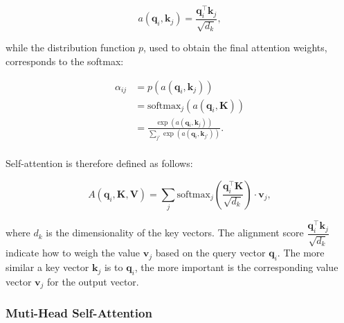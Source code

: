 \begin{equation}
\label{equation:related-pretrained-language-models-sa-alignment}
    a(\bm{q}_i, \bm{k}_j) = \frac{\bm{q}_i^{\top} \bm{k}_j}{\sqrt{d_k}}, 
\end{equation}

\noindent while the distribution function $p$, used to obtain the final attention weights, corresponds to the softmax: 

\begin{equation}
    \begin{aligned}
        \alpha_{ij} &= p(a(\bm{q}_i, \bm{k}_j)) \\
                    &= \textrm{softmax}_j (a(\bm{q}_i, \bm{K})) \\ 
                    &= \frac{\exp(a(\bm{q}_{i}, \bm{k}_j))}{\sum_{j'} \exp(a(\bm{q}_{i}, \bm{k}_{j'}))}. \\
\end{aligned}
\end{equation}

\noindent Self-attention is therefore defined as follows:

\begin{equation}
    A(\bm{q}_i, \bm{K}, \bm{V}) = \sum_j \textrm{softmax}_j\left(\frac{\bm{q}_i^{\top} \bm{K}}{\sqrt{d_k}}\right) \cdot \bm{v}_j,
\label{equation:self-attention}
\end{equation}


\noindent where $d_k$ is the dimensionality of the key vectors. The alignment score $\dfrac{\bm{q}_i^{\top} \bm{k}_j}{\sqrt{d_k}}$ indicate how to weigh the value $\bm{v}_j$ based on the query vector $\bm{q}_i$. The more similar a key vector $\bm{k}_j$ is to $\bm{q}_i$, the more important is the corresponding value vector $\bm{v}_j$ for the output vector. 


\subsubsection{Muti-Head Self-Attention} 

